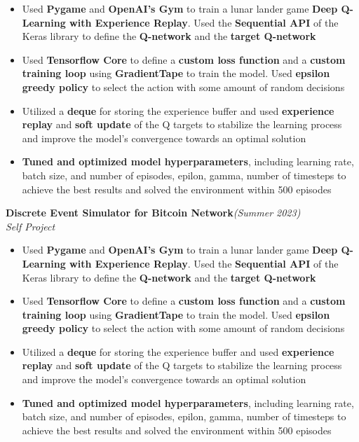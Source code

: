 \documentclass[a4paper,10pt]{article}
\begin{document}
\begin{itemize}[itemsep = -0.65 mm, leftmargin=*]
    \item Used \textbf{Pygame} and \textbf{OpenAI's Gym} to train a lunar lander game \textbf{Deep Q-Learning with Experience Replay}. Used the \textbf{Sequential API} of the Keras library to define the \textbf{Q-network} and the \textbf{target Q-network}
    \item Used \textbf{Tensorflow Core} to define a \textbf{custom loss function} and a \textbf{custom training loop} using \textbf{GradientTape} to train the model. Used \textbf{epsilon greedy policy} to select the action with some amount of random decisions
    \item Utilized a \textbf{deque} for storing the experience buffer and used \textbf{experience replay} and \textbf{soft update} of the Q targets to stabilize the learning process and improve the model's convergence towards an optimal solution
    \item \textbf{Tuned and optimized model hyperparameters}, including learning rate, batch size, and number of episodes, epilon, gamma, number of timesteps to achieve the best results and solved the environment within 500 episodes
\end{itemize}
\vspace{\baselineskip}
\vspace{-15pt}
\noindent\textbf{\large Discrete Event Simulator for Bitcoin Network}\hfill{\sl \small (Summer 2023)}\\
{\it Self Project}
\\\vspace{-15pt}
\begin{itemize}[itemsep = -0.65 mm, leftmargin=*]
    \item Used \textbf{Pygame} and \textbf{OpenAI's Gym} to train a lunar lander game \textbf{Deep Q-Learning with Experience Replay}. Used the \textbf{Sequential API} of the Keras library to define the \textbf{Q-network} and the \textbf{target Q-network}
    \item Used \textbf{Tensorflow Core} to define a \textbf{custom loss function} and a \textbf{custom training loop} using \textbf{GradientTape} to train the model. Used \textbf{epsilon greedy policy} to select the action with some amount of random decisions
    \item Utilized a \textbf{deque} for storing the experience buffer and used \textbf{experience replay} and \textbf{soft update} of the Q targets to stabilize the learning process and improve the model's convergence towards an optimal solution
    \item \textbf{Tuned and optimized model hyperparameters}, including learning rate, batch size, and number of episodes, epilon, gamma, number of timesteps to achieve the best results and solved the environment within 500 episodes
\end{itemize}
\end{document}
